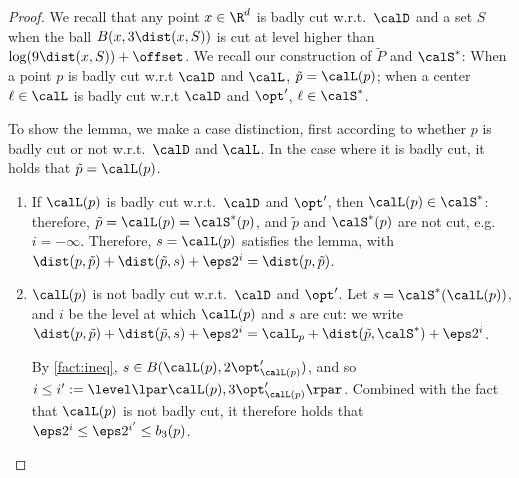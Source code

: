 \begin{proof}
We recall that any point $x \in \R^d$ is badly cut w.r.t.\ $\calD$ and a set $S$ when the ball $B(x, 3\dist(x, S))$ is cut at level higher than $\log(9 \dist(x, S)) + \offset$. 
We recall our construction of $\tilde P$ and $\calS^*$: When a point $p$ is badly cut w.r.t $\calD$ and $\calL$, $\tilde p = \calL(p)$; when a center $\ell \in \calL$ is badly cut  w.r.t $\calD$ and $\opt'$, $\ell \in \calS^*$. 


To show the lemma, we make a case distinction, first according to whether $p$ is badly cut or not w.r.t.~$\calD$ and $\calL$. 
In the case where it is badly cut, it holds that $\tilde p = \calL(p)$.

\begin{enumerate}
 \item If $\calL(p)$ is badly cut w.r.t.\ $\calD$ and $\opt'$, then $\calL(p) \in \calS^*$: therefore, 
$\tilde p = \calL(p) =  \calS^*(p)$, and $\tilde p$ and $ \calS^*(p)$ are not cut, e.g. $i=-\infty$. Therefore, $s = \calL(p)$ satisfies the lemma, with $\dist(p, \tilde p) + \dist(\tilde p, s) + \eps 2^i = \dist(p, \tilde p)$. 
 \item $\calL(p)$ is not badly cut w.r.t.\ $\calD$ and $\opt'$. Let $s = \calS^*(\calL(p))$, and $i$ be the level at which $\calL(p)$ and $s$ are cut: we write 
 $\dist(p, \tilde p) + \dist(\tilde p, s) + \eps 2^i = \calL_p + \dist(\tilde p, \calS^*) + \eps 2^{i}$. 
 
 By \cref{fact:ineq}, $s \in B(\calL(p), 2\opt'_{\calL(p)})$, and so
  $i \leq i' := \level\lpar \calL(p),  3\opt'_{\calL(p)}\rpar$. 
 Combined with the fact that $\calL(p)$ is not badly cut,  it therefore holds that 
 $\eps 2^{i} \leq \eps 2^{i'} \leq b_3(p)$. 
  \end{enumerate}
 

\end{proof}
